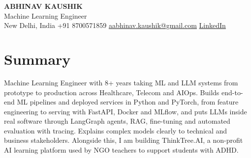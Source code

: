 \documentclass[10pt,a4paper]{article}
\begin{document}
\begin{center}
  {\LARGE\bfseries ABHINAV KAUSHIK}\\[2pt]
  {\large Machine Learning Engineer}\\[2pt]
  New Delhi, India \textbar{} +91 8700571859 \textbar{} \href{mailto:aabhinav.kaushik@gmail.com}{aabhinav.kaushik@gmail.com} \textbar{} \href{https://www.linkedin.com/in/abhinav-kaushik10/}{LinkedIn}  
\end{center}

\section{Summary}
Machine Learning Engineer with 8+ years taking ML and LLM systems from prototype to production across Healthcare, Telecom and AIOps. Builds end-to-end ML pipelines and deployed services in Python and PyTorch, from feature engineering to serving with FastAPI, Docker and MLflow, and puts LLMs inside real software through LangGraph agents, RAG, fine-tuning and automated evaluation with tracing. Explains complex models clearly to technical and business stakeholders. Alongside this, I am building ThinkTree.AI, a non-profit AI learning platform used by NGO teachers to support students with ADHD.
\end{document}
